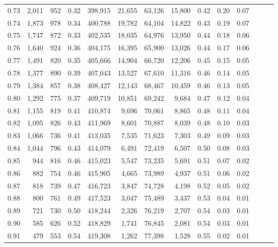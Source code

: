 \begin{tabular}{rrrrrrrrrrrrrr}
0.73 &  2,011 &    952 &  0.32 &  398,915 &   21,655 &  63,126 &  15,800 &  0.42 &  0.20 &      0.07 \\
0.74 &  1,873 &    978 &  0.34 &  400,788 &   19,782 &  64,104 &  14,822 &  0.43 &  0.19 &      0.07 \\
0.75 &  1,747 &    872 &  0.33 &  402,535 &   18,035 &  64,976 &  13,950 &  0.44 &  0.18 &      0.06 \\
0.76 &  1,640 &    924 &  0.36 &  404,175 &   16,395 &  65,900 &  13,026 &  0.44 &  0.17 &      0.06 \\
0.77 &  1,491 &    820 &  0.35 &  405,666 &   14,904 &  66,720 &  12,206 &  0.45 &  0.15 &      0.05 \\
0.78 &  1,377 &    890 &  0.39 &  407,043 &   13,527 &  67,610 &  11,316 &  0.46 &  0.14 &      0.05 \\
0.79 &  1,384 &    857 &  0.38 &  408,427 &   12,143 &  68,467 &  10,459 &  0.46 &  0.13 &      0.05 \\
0.80 &  1,292 &    775 &  0.37 &  409,719 &   10,851 &  69,242 &   9,684 &  0.47 &  0.12 &      0.04 \\
0.81 &  1,155 &    819 &  0.41 &  410,874 &    9,696 &  70,061 &   8,865 &  0.48 &  0.11 &      0.04 \\
0.82 &  1,095 &    826 &  0.43 &  411,969 &    8,601 &  70,887 &   8,039 &  0.48 &  0.10 &      0.03 \\
0.83 &  1,066 &    736 &  0.41 &  413,035 &    7,535 &  71,623 &   7,303 &  0.49 &  0.09 &      0.03 \\
0.84 &  1,044 &    796 &  0.43 &  414,079 &    6,491 &  72,419 &   6,507 &  0.50 &  0.08 &      0.03 \\
0.85 &    944 &    816 &  0.46 &  415,023 &    5,547 &  73,235 &   5,691 &  0.51 &  0.07 &      0.02 \\
0.86 &    882 &    754 &  0.46 &  415,905 &    4,665 &  73,989 &   4,937 &  0.51 &  0.06 &      0.02 \\
0.87 &    818 &    739 &  0.47 &  416,723 &    3,847 &  74,728 &   4,198 &  0.52 &  0.05 &      0.02 \\
0.88 &    800 &    761 &  0.49 &  417,523 &    3,047 &  75,489 &   3,437 &  0.53 &  0.04 &      0.01 \\
0.89 &    721 &    730 &  0.50 &  418,244 &    2,326 &  76,219 &   2,707 &  0.54 &  0.03 &      0.01 \\
0.90 &    585 &    626 &  0.52 &  418,829 &    1,741 &  76,845 &   2,081 &  0.54 &  0.03 &      0.01 \\
0.91 &    479 &    553 &  0.54 &  419,308 &    1,262 &  77,398 &   1,528 &  0.55 &  0.02 &      0.01 \\

\end{tabular}
